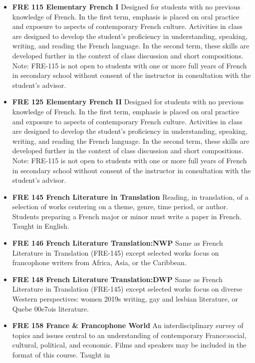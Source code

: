 \documentclass[
  letterpaper,
]{scrbook}
\providecommand{\tightlist}{%
  \setlength{\itemsep}{0pt}\setlength{\parskip}{0pt}}
\begin{document}
\begin{itemize}
\tightlist
\item
  \textbf{FRE 115 Elementary French I} Designed for students with no
  previous knowledge of French. In the first term, emphasis is placed on
  oral practice and exposure to aspects of contemporary French culture.
  Activities in class are designed to develop the student's proficiency
  in understanding, speaking, writing, and reading the French language.
  In the second term, these skills are developed further in the context
  of class discussion and short compositions. Note: FRE-115 is not open
  to students with one or more full years of French in secondary school
  without consent of the instructor in consultation with the student's
  advisor.
\item
  \textbf{FRE 125 Elementary French II} Designed for students with no
  previous knowledge of French. In the first term, emphasis is placed on
  oral practice and exposure to aspects of contemporary French culture.
  Activities in class are designed to develop the student's proficiency
  in understanding, speaking, writing, and reading the French language.
  In the second term, these skills are developed further in the context
  of class discussion and short compositions. Note: FRE-115 is not open
  to students with one or more full years of French in secondary school
  without consent of the instructor in consultation with the student's
  advisor.
\item
  \textbf{FRE 145 French Literature in Translation} Reading, in
  translation, of a selection of works centering on a theme, genre, time
  period, or author. Students preparing a French major or minor must
  write a paper in French. Taught in English.
\item
  \textbf{FRE 146 French Literature Translation:NWP} Same as French
  Literature in Translation (FRE-145) except selected works focus on
  francophone writers from Africa, Asia, or the Caribbean.
\item
  \textbf{FRE 148 French Literature Translation:DWP} Same as French
  Literature in Translation (FRE-145) except selected works focus on
  diverse Western perspectives: women 2019s writing, gay and lesbian
  literature, or Quebe 00e7ois literature.
\item
  \textbf{FRE 158 France \& Francophone World} An interdisciplinary
  survey of topics and issues central to an understanding of
  contemporary France:social, cultural, political, and economic. Films
  and speakers may be included in the format of this course. Taught in

\end{itemize}
\end{document}
